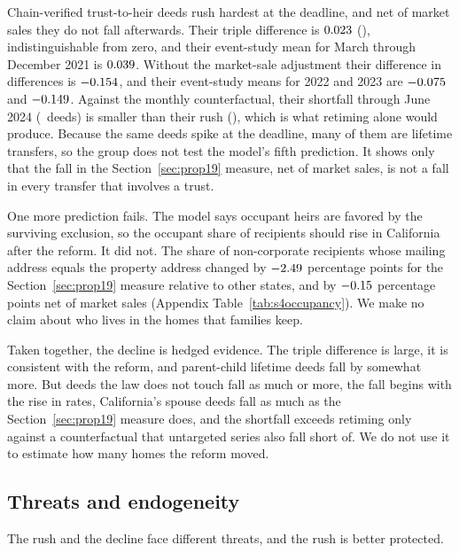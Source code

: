 Chain-verified trust-to-heir deeds rush hardest at the deadline, and net of market sales they do not fall afterwards. Their triple difference is $0.023$ (\SIVHeirDDDSE), indistinguishable from zero, and their event-study mean for March through December 2021 is $0.039$. Without the market-sale adjustment their difference in differences is $-0.154$, and their event-study means for 2022 and 2023 are $-0.075$ and $-0.149$. Against the monthly counterfactual, their shortfall through June 2024 (\SIVHeirShortfall\ deeds) is smaller than their rush (\SIVHeirRush), which is what retiming alone would produce. Because the same deeds spike at the deadline, many of them are lifetime transfers, so the group does not test the model's fifth prediction. It shows only that the fall in the Section~\ref{sec:prop19} measure, net of market sales, is not a fall in every transfer that involves a trust.

One more prediction fails. The model says occupant heirs are favored by the surviving exclusion, so the occupant share of recipients should rise in California after the reform. It did not. The share of non-corporate recipients whose mailing address equals the property address changed by $-2.49$ percentage points for the Section~\ref{sec:prop19} measure relative to other states, and by $-0.15$ percentage points net of market sales (Appendix Table~\ref{tab:s4occupancy}). We make no claim about who lives in the homes that families keep.

Taken together, the decline is hedged evidence. The triple difference is large, it is consistent with the reform, and parent-child lifetime deeds fall by somewhat more. But deeds the law does not touch fall as much or more, the fall begins with the rise in rates, California's spouse deeds fall as much as the Section~\ref{sec:prop19} measure does, and the shortfall exceeds retiming only against a counterfactual that untargeted series also fall short of. We do not use it to estimate how many homes the reform moved.

\subsection{Threats and endogeneity}\label{subsec:threats}

The rush and the decline face different threats, and the rush is better protected.

